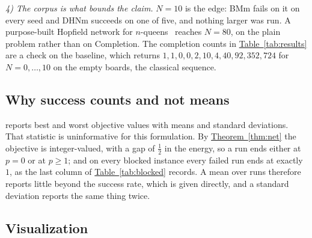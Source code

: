 \documentclass{easychair}
\newcommand{\citeref}[1]{\textcolor{academicpurple}{\cite{#1}}}
\newcommand{\thmref}[1]{\textcolor{academicpurple}{\hyperref[#1]{Theorem~\ref*{#1}}}}
\newcommand{\tabref}[1]{\textcolor{academicpurple}{\hyperref[#1]{Table~\ref*{#1}}}}
\begin{document}
\emph{4) The corpus is what bounds the claim.} $N = 10$ is the edge: BMm fails on it on every seed
and DHNm succeeds on one of five, and nothing larger was run. A purpose-built
Hopfield network for $n$-queens~\citeref{mandziuk1995} reaches $N = 80$, on the plain problem rather
than on Completion. The completion counts in \tabref{tab:results} are a check on the baseline, which
returns $1,1,0,0,2,10,4,40,92,352,724$ for $N = 0,\dots,10$ on the empty boards, the classical
sequence.

\subsection{Why success counts and not means}\label{sec:stats}

\citeref{liwang2022} reports best and worst objective values with means and standard deviations. That
statistic is uninformative for this formulation. By \thmref{thm:net} the objective is integer-valued,
with a gap of $\tfrac12$ in the energy, so a run ends either at $p = 0$ or at $p \ge 1$; and on every
blocked instance every failed run ends at exactly $1$, as the last column of \tabref{tab:blocked}
records. A mean over runs therefore reports little beyond the success rate, which is given directly,
and a standard deviation reports the same thing twice.

\subsection{Visualization}\label{sec:vis}
\end{document}
